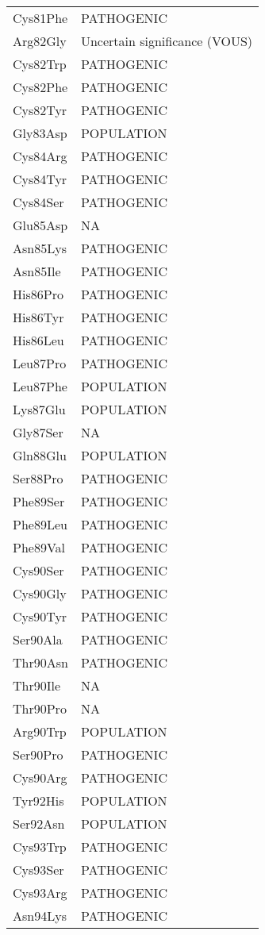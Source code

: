 \begin{longtable}[l]{l|l}
	Cys81Phe & PATHOGENIC \\
	Arg82Gly & Uncertain significance (VOUS) \\
	Cys82Trp & PATHOGENIC \\
	Cys82Phe & PATHOGENIC \\
	Cys82Tyr & PATHOGENIC \\
	Gly83Asp & POPULATION \\
	Cys84Arg & PATHOGENIC \\
	Cys84Tyr & PATHOGENIC \\
	Cys84Ser & PATHOGENIC \\
	Glu85Asp & NA \\
	Asn85Lys & PATHOGENIC \\
	Asn85Ile & PATHOGENIC \\
	His86Pro & PATHOGENIC \\
	His86Tyr & PATHOGENIC \\
	His86Leu & PATHOGENIC \\
	Leu87Pro & PATHOGENIC \\
	Leu87Phe & POPULATION \\
	Lys87Glu & POPULATION \\
	Gly87Ser & NA \\
	Gln88Glu & POPULATION \\
	Ser88Pro & PATHOGENIC \\
	Phe89Ser & PATHOGENIC \\
	Phe89Leu & PATHOGENIC \\
	Phe89Val & PATHOGENIC \\
	Cys90Ser & PATHOGENIC \\
	Cys90Gly & PATHOGENIC \\
	Cys90Tyr & PATHOGENIC \\
	Ser90Ala & PATHOGENIC \\
	Thr90Asn & PATHOGENIC \\
	Thr90Ile & NA \\
	Thr90Pro & NA \\
	Arg90Trp & POPULATION \\
	Ser90Pro & PATHOGENIC \\
	Cys90Arg & PATHOGENIC \\
	Tyr92His & POPULATION \\
	Ser92Asn & POPULATION \\
	Cys93Trp & PATHOGENIC \\
	Cys93Ser & PATHOGENIC \\
	Cys93Arg & PATHOGENIC \\
	Asn94Lys & PATHOGENIC \\

\end{longtable}
